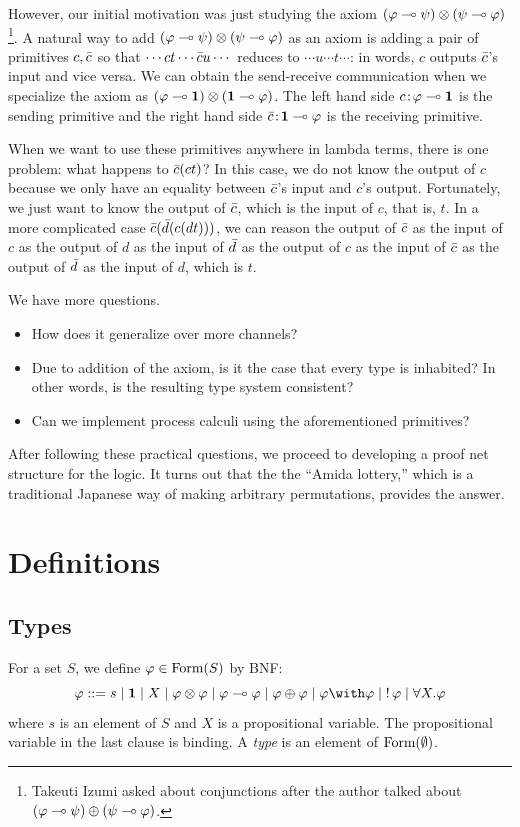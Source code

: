 However, our initial motivation was just studying the axiom
$(\varphi\multimap\psi)\otimes(\psi\multimap\varphi)$%
\footnote{Takeuti Izumi asked about conjunctions
after the author talked about $(\varphi\multimap\psi)\oplus (\psi\multimap\varphi)$.}.
A natural way to add $(\varphi\multimap\psi)\otimes(\psi\multimap\varphi)$ as an axiom
is adding a pair of primitives $c,\bar{c}$ so that
$\cdots ct \cdots \bar{c} u \cdots$ reduces to
$\cdots u  \cdots t \cdots$: in words,
$c$ outputs $\bar{c}$'s input and vice versa.
We can obtain the send-receive communication when we specialize the
axiom as $(\varphi\multimap \mathbf{1})\otimes(\mathbf{1}\multimap\varphi)$.  The left hand side
${c} \mathord{\colon\kern -2pt}{\varphi\multimap\mathbf{1}}$ is the sending primitive and
the right hand side ${\bar{c}} \mathord{\colon\kern -2pt}{\mathbf{1} \multimap\varphi}$ is the receiving
primitive.

When we want to use these primitives anywhere in lambda terms,
there is one problem: what happens to $\bar{c}(c t)$?
In this case, we do not know the output of $c$ because we only have an
equality between $\bar{c}$'s input and $c$'s output.
Fortunately, we just want to know the output of $\bar{c}$, which is the
input of $c$, that is, $t$.
In a more complicated case $\bar{c}(\bar{d}(c (d t)))$,
we can reason the output of $\bar{c}$ as the input of $c$ as the output of
$d$ as the input of $\bar{d}$ as the output of $c$ as the input of $\bar{c}$
as the output of $\bar{d}$ as the input of $d$, which is $t$.

We have more questions.
\begin{itemize}
 \item How does it generalize over more channels?
 \item Due to addition of the axiom, is it the case that
       every type is inhabited?  In other words,
      is the resulting type system consistent?
 \item Can we implement process calculi using the aforementioned primitives?
\end{itemize}

After following these practical questions,
we proceed to developing a proof net structure for the logic.
It turns out that the the ``Amida lottery,'' which is a traditional
Japanese way of making arbitrary permutations, provides the answer.


\section{Definitions}

\subsection{Types}
For a set $S$, we define $\varphi\in\mathop{\text{Form}}(S)$ by BNF:
\[
 \phi::=s\mid \one \mid X \mid \phi\otimes\phi\mid \phi\limp\phi\mid
 \phi\oplus\phi\mid \phi\with\phi\mid \bang\phi\mid \forall X.\phi
\]
where $s$ is an element of $S$ and $X$ is a propositional variable.
The propositional variable in the last clause is binding.
A \textit{type} is an element of $\mathop{\text{Form}}(\emptyset)$.

